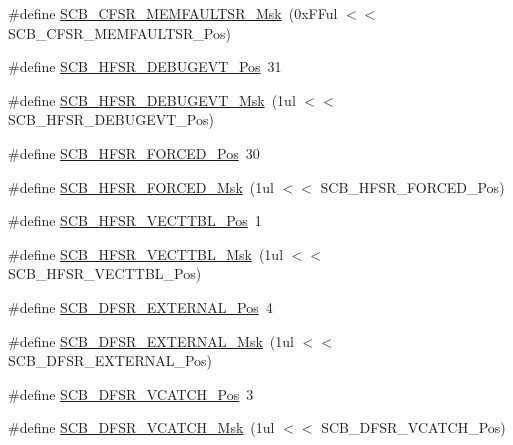 \begin{DoxyCompactItemize}
\item 
\#define \hyperlink{group__CMSIS__CM3__SCB_gad46716159a3808c9e7da22067d6bec98}{S\+C\+B\+\_\+\+C\+F\+S\+R\+\_\+\+M\+E\+M\+F\+A\+U\+L\+T\+S\+R\+\_\+\+Msk}~(0x\+F\+Ful $<$$<$ S\+C\+B\+\_\+\+C\+F\+S\+R\+\_\+\+M\+E\+M\+F\+A\+U\+L\+T\+S\+R\+\_\+\+Pos)
\item 
\#define \hyperlink{group__CMSIS__CM3__SCB_ga300c90cfb7b35c82b4d44ad16c757ffb}{S\+C\+B\+\_\+\+H\+F\+S\+R\+\_\+\+D\+E\+B\+U\+G\+E\+V\+T\+\_\+\+Pos}~31
\item 
\#define \hyperlink{group__CMSIS__CM3__SCB_gababd60e94756bb33929d5e6f25d8dba3}{S\+C\+B\+\_\+\+H\+F\+S\+R\+\_\+\+D\+E\+B\+U\+G\+E\+V\+T\+\_\+\+Msk}~(1ul $<$$<$ S\+C\+B\+\_\+\+H\+F\+S\+R\+\_\+\+D\+E\+B\+U\+G\+E\+V\+T\+\_\+\+Pos)
\item 
\#define \hyperlink{group__CMSIS__CM3__SCB_gab361e54183a378474cb419ae2a55d6f4}{S\+C\+B\+\_\+\+H\+F\+S\+R\+\_\+\+F\+O\+R\+C\+E\+D\+\_\+\+Pos}~30
\item 
\#define \hyperlink{group__CMSIS__CM3__SCB_ga6560d97ed043bc01152a7247bafa3157}{S\+C\+B\+\_\+\+H\+F\+S\+R\+\_\+\+F\+O\+R\+C\+E\+D\+\_\+\+Msk}~(1ul $<$$<$ S\+C\+B\+\_\+\+H\+F\+S\+R\+\_\+\+F\+O\+R\+C\+E\+D\+\_\+\+Pos)
\item 
\#define \hyperlink{group__CMSIS__CM3__SCB_ga77993da8de35adea7bda6a4475f036ab}{S\+C\+B\+\_\+\+H\+F\+S\+R\+\_\+\+V\+E\+C\+T\+T\+B\+L\+\_\+\+Pos}~1
\item 
\#define \hyperlink{group__CMSIS__CM3__SCB_gaac5e289211d0a63fe879a9691cb9e1a9}{S\+C\+B\+\_\+\+H\+F\+S\+R\+\_\+\+V\+E\+C\+T\+T\+B\+L\+\_\+\+Msk}~(1ul $<$$<$ S\+C\+B\+\_\+\+H\+F\+S\+R\+\_\+\+V\+E\+C\+T\+T\+B\+L\+\_\+\+Pos)
\item 
\#define \hyperlink{group__CMSIS__CM3__SCB_ga13f502fb5ac673df9c287488c40b0c1d}{S\+C\+B\+\_\+\+D\+F\+S\+R\+\_\+\+E\+X\+T\+E\+R\+N\+A\+L\+\_\+\+Pos}~4
\item 
\#define \hyperlink{group__CMSIS__CM3__SCB_ga3cba2ec1f588ce0b10b191d6b0d23399}{S\+C\+B\+\_\+\+D\+F\+S\+R\+\_\+\+E\+X\+T\+E\+R\+N\+A\+L\+\_\+\+Msk}~(1ul $<$$<$ S\+C\+B\+\_\+\+D\+F\+S\+R\+\_\+\+E\+X\+T\+E\+R\+N\+A\+L\+\_\+\+Pos)
\item 
\#define \hyperlink{group__CMSIS__CM3__SCB_gad02d3eaf062ac184c18a7889c9b6de57}{S\+C\+B\+\_\+\+D\+F\+S\+R\+\_\+\+V\+C\+A\+T\+C\+H\+\_\+\+Pos}~3
\item 
\#define \hyperlink{group__CMSIS__CM3__SCB_gacbb931575c07b324ec793775b7c44d05}{S\+C\+B\+\_\+\+D\+F\+S\+R\+\_\+\+V\+C\+A\+T\+C\+H\+\_\+\+Msk}~(1ul $<$$<$ S\+C\+B\+\_\+\+D\+F\+S\+R\+\_\+\+V\+C\+A\+T\+C\+H\+\_\+\+Pos)

\end{DoxyCompactItemize}
